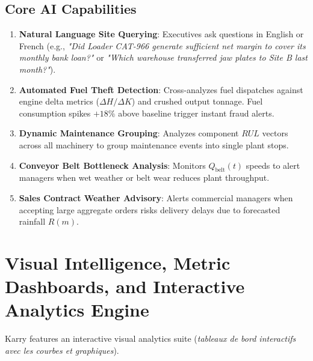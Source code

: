\documentclass[11pt, a4paper]{article}
\begin{document}
\subsection{Core AI Capabilities}
\begin{enumerate}
    \item \textbf{Natural Language Site Querying}: Executives ask questions in English or French (e.g., \textit{"Did Loader CAT-966 generate sufficient net margin to cover its monthly bank loan?"} or \textit{"Which warehouse transferred jaw plates to Site B last month?"}).
    \item \textbf{Automated Fuel Theft Detection}: Cross-analyzes fuel dispatches against engine delta metrics ($\Delta H / \Delta K$) and crushed output tonnage. Fuel consumption spikes $+18\%$ above baseline trigger instant fraud alerts.
    \item \textbf{Dynamic Maintenance Grouping}: Analyzes component $RUL$ vectors across all machinery to group maintenance events into single plant stops.
    \item \textbf{Conveyor Belt Bottleneck Analysis}: Monitors $Q_{\text{belt}}(t)$ speeds to alert managers when wet weather or belt wear reduces plant throughput.
    \item \textbf{Sales Contract Weather Advisory}: Alerts commercial managers when accepting large aggregate orders risks delivery delays due to forecasted rainfall $R(m)$.
\end{enumerate}

\section{Visual Intelligence, Metric Dashboards, and Interactive Analytics Engine}

Karry features an interactive visual analytics suite (\textit{tableaux de bord interactifs avec les courbes et graphiques}).
\end{document}
